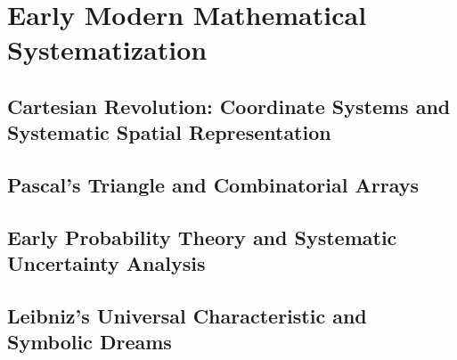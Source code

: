 
\chapter{Early Modern Mathematical Systematization}

\section{Cartesian Revolution: Coordinate Systems and Systematic Spatial Representation}

\section{Pascal's Triangle and Combinatorial Arrays}

\section{Early Probability Theory and Systematic Uncertainty Analysis}

\section{Leibniz's Universal Characteristic and Symbolic Dreams}

